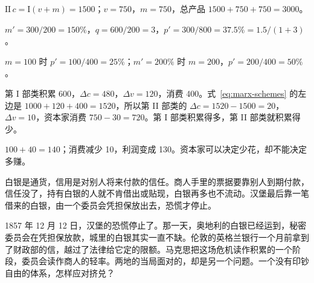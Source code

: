 \begin{answers}
\item $\text{II}\,c=\text{I}(v+m)=1500$；$v=750$，$m=750$，总产品 $1500+750+750=3000$。
\item $m'=300/200=150\%$，$q=600/200=3$，$p'=300/800=37.5\%=1.5/(1+3)$。
\item $m=100$ 时 $p'=100/400=25\%$；$m'=200\%$ 时 $m=200$，$p'=200/400=50\%$。
\item 第 I 部类积累 600，$\Delta c=480$，$\Delta v=120$，消费 400。式~\eqref{eq:marx-schemes} 的左边是 $1000+120+400=1520$，所以第 II 部类的 $\Delta c=1520-1500=20$，$\Delta v=10$，资本家消费 $750-30=720$。第 I 部类积累得多，第 II 部类就积累得少。
\item $100+40=140$；消费减少 10，利润变成 130。资本家可以决定少花，却不能决定多赚。
\item 白银是通货，信用是对别人将来付款的信任。商人手里的票据要靠别人到期付款，信任没了，持有白银的人就不肯借出或贴现，白银再多也不流动。汉堡最后靠一笔借来的白银，由一个委员会凭担保放出去，恐慌才停止。
\end{answers}

1857 年 12 月 12 日，汉堡的恐慌停止了。那一天，奥地利的白银已经运到，秘密委员会在凭担保放款，城里的白银其实一直不缺\cite{evans1859}。伦敦的英格兰银行一个月前拿到了财政部的信，越过了法律给它定的限额。马克思把这场危机读作积累的一个阶段，委员会读作商人的轻率。两地的当局面对的，却是另一个问题。一个没有印钞自由的体系，怎样应对挤兑？

